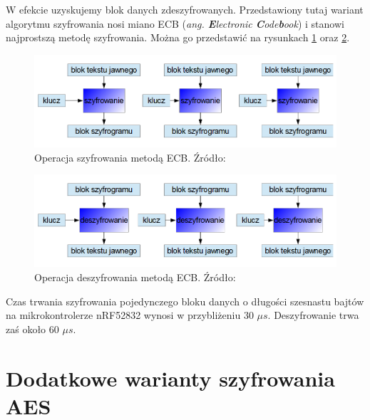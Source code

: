 W efekcie uzyskujemy blok danych zdeszyfrowanych.
Przedstawiony tutaj wariant algorytmu szyfrowania nosi miano ECB (\textit{ang. \textbf{E}lectronic \textbf{C}ode\textbf{b}ook}) i stanowi najprostszą metodę szyfrowania. Można go przedstawić na rysunkach \ref{fig:image_ecb_encrypt} oraz \ref{fig:image_ecb_decrypt}.

	\begin{figure}[h]
		\centering
		\includegraphics[width=15cm]{img/com_security/ECB_szyfrowanie.png}
		\caption{Operacja szyfrowania metodą ECB. Źródło: \cite{aes_cryptoit}}
		\label{fig:image_ecb_encrypt}
	\end{figure}
	
	\begin{figure}[h]
		\centering
		\includegraphics[width=15cm]{img/com_security/ECB_deszyfrowanie.png}
		\caption{Operacja deszyfrowania metodą ECB. Źródło: \cite{aes_cryptoit}}
		\label{fig:image_ecb_decrypt}
	\end{figure}
	
Czas trwania szyfrowania pojedynczego bloku danych o długości szesnastu bajtów na mikrokontrolerze nRF52832 wynosi w przybliżeniu 30 $\mu s$. Deszyfrowanie trwa zaś około 60 $\mu s$.


\section{Dodatkowe warianty szyfrowania AES}

